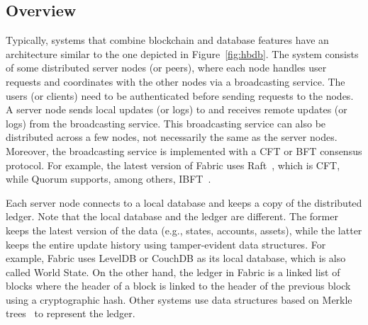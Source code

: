 \documentclass[11pt]{article}
\begin{document}
\subsection{Overview}

Typically, systems that combine blockchain and database features have an architecture similar to the one depicted in Figure~\ref{fig:hbdb}. The system consists of some distributed server nodes (or peers), where each node handles user requests and coordinates with the other nodes via a broadcasting service. The users (or clients) need to be authenticated before sending requests to the nodes. A server node sends local updates (or logs) to and receives remote updates (or logs) from the broadcasting service. This broadcasting service can also be distributed across a few nodes, not necessarily the same as the server nodes. Moreover, the broadcasting service is implemented with a CFT or BFT consensus protocol. For example, the latest version of Fabric uses Raft~\cite{raft}, which is CFT, while Quorum supports, among others, IBFT~\cite{ibft}.

Each server node connects to a local database and keeps a copy of the distributed ledger. Note that the local database and the ledger are different. The former keeps the latest version of the data (e.g., states, accounts, assets), while the latter keeps the entire update history using tamper-evident data structures. For example, Fabric uses LevelDB or CouchDB as its local database, which is also called World State. On the other hand, the ledger in Fabric is a linked list of blocks where the header of a block is linked to the header of the previous block using a cryptographic hash. Other systems use data structures based on Merkle trees~\cite{merkle_tree} to represent the ledger.
\end{document}
